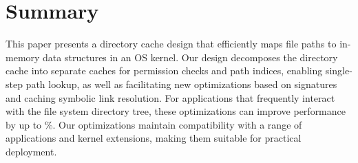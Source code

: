 \section{Summary}
\label{sec:dcache:summary}

This paper presents a directory cache design
that efficiently 
maps file paths to in-memory data structures
in an OS kernel.
Our design decomposes the directory cache into separate caches
for permission checks and path indices, enabling single-step path lookup,
as well as facilitating new optimizations based
on signatures and caching symbolic link resolution.
For applications that frequently 
interact with the file system directory tree, these optimizations 
can improve performance by up to \updatedbspeedup\%.
Our optimizations
maintain compatibility with a range of applications and kernel extensions,
making them suitable for practical deployment.

